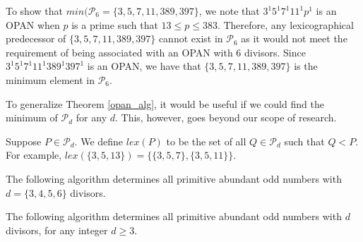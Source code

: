 \documentclass[../paper.tex]{subfiles}
\begin{document}
To show that $min(\mathcal{P}_6 = \{3, 5, 7, 11, 389, 397\}$, we
note that $3^1 5^1 7^1 11^1 p^1$ is an OPAN when $p$ is a prime
such that $13 \leq p \leq 383$. Therefore, any lexicographical
predecessor of $\{3, 5, 7, 11, 389, 397\}$ cannot exist in
$\mathcal{P}_6$ as it would not meet the requirement of being
associated with an OPAN with 6 divisors. Since $3^1 5^1 7^1 11^1 
389^1 397^1$ is an OPAN, we have that $\{3, 5, 7, 11, 389, 397\}$
is the minimum element in $\mathcal{P}_6$.

To generalize Theorem {\ref{opan_alg}}, it would be useful if we
could find the minimum of $\mathcal{P}_d$ for any $d$. This,
however, goes beyond our scope of research.

Suppose $P \in \mathcal{P}_d$. We define $lex(P)$ to be the set
of all $Q \in \mathcal{P}_d$ such that $Q < P$. For example,  
$lex(\{3,5,13\}) = \{\{3, 5, 7\}, \{3, 5, 11\}\}$.

\begin{theorem} \label{opan_alg}
The following algorithm determines all primitive
abundant odd numbers with $d = \{3,4,5,6\}$ divisors.
\end{theorem}

\begin{conj}
The following algorithm determines all primitive
abundant odd numbers with $d$ divisors, for any integer $d \geq 3$.
\end{conj}

\noindent{}
\end{document}
